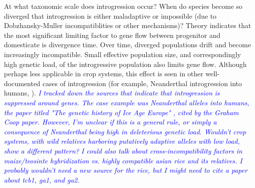 \documentclass[11pt]{article}
\newcommand{\gmj}[1]{\textcolor{blue}{ \emph{\scriptsize  #1}} } %
\begin{document}
At what taxonomic scale does introgression occur?
When do species become so diverged that introgression is either maladaptive or impossible (due to  Dobzhansky-Muller incompatiblities or other mechanisms)?
Theory indicates that the most significant limiting factor to gene flow between progenitor and domesticate is divergence time.
Over time, diverged populations drift and become increasingly incompatible.
Small effective population size, and correspondingly high genetic load, of the introgressive population also limits gene flow.
Although perhaps less applicable in crop systems, this effect is seen in other well-documented cases of introgression (for example, Neanderthal introgression into humans, \cite{harris2016genetic}).
\gmj{I tracked down the sources that indicate that introgression is suppressed around genes.  The case example was Neanderthal alleles into humans, the paper titled "The genetic history of Ice Age Europe" \cite{fu2016genetic}, cited by the Graham Coop paper.  However, I'm unclear if this is a general rule, or simply a consequence of Neanderthal being high in deleterious genetic load.  Wouldn't crop systems, with wild relatives harboring putatively adaptive alleles with low load, show a different pattern?}
\gmj{I could also talk about cross-incompatibility factors in maize/teosinte hybridization vs. highly compatible asian rice and its relatives.  I probably wouldn't need a new source for the rice, but I might need to cite a paper about tcb1, ga1, and ga2.}
\end{document}
